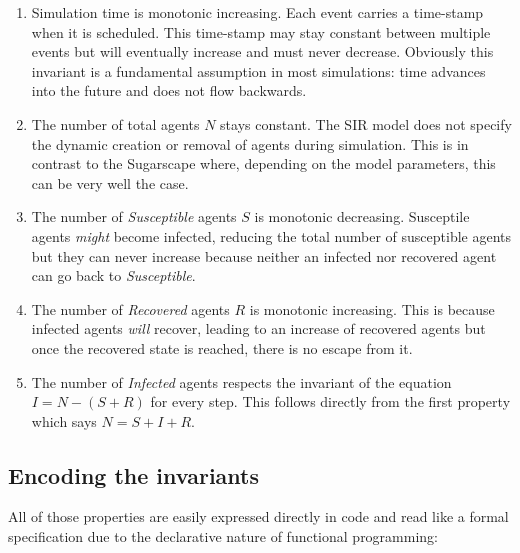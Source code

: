\begin{enumerate}
	\item Simulation time is monotonic increasing. %
	Each event carries a time-stamp when it is scheduled. This time-stamp may stay constant between multiple events but will eventually increase and must never decrease. Obviously this invariant is a fundamental assumption in most simulations: time advances into the future and does not flow backwards.
	
	\item The number of total agents $N$ stays constant. The SIR model does not specify the dynamic creation or removal of agents during simulation. This is in contrast to the Sugarscape where, depending on the model parameters, this can be very well the case.
	
	\item The number of \textit{Susceptible} agents $S$ is monotonic decreasing. Susceptile agents \textit{might} become infected, reducing the total number of susceptible agents but they can never increase because neither an infected nor recovered agent can go back to \textit{Susceptible}.
	
	\item The number of \textit{Recovered} agents $R$ is monotonic increasing. This is because infected agents \textit{will} recover, leading to an increase of recovered agents but once the recovered state is reached, there is no escape from it.
	
	\item The number of \textit{Infected} agents respects the invariant of the equation $I = N - (S + R)$ for every step. This follows directly from the first property which says $N = S + I + R$.
\end{enumerate}

\subsection{Encoding the invariants}
All of those properties are easily expressed directly in code and read like a formal specification due to the declarative nature of functional programming:

